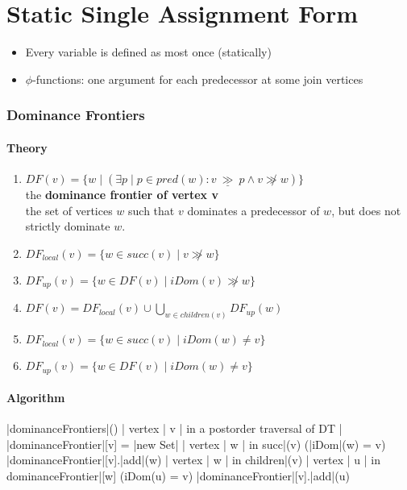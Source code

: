 \documentclass[a4paper,12pt, notitlepage]{article}
\newcommand{\gge}{\ \underline{\gg}\ }
\newcommand{\existe}[3]{(\exists #1 \mid #2 : #3)}
\begin{document}
\section*{Static Single Assignment Form}
\begin{itemize}
\item Every variable is defined as most once (statically)
\item $\phi$-functions: one argument for each predecessor at some join vertices
\end{itemize}

\subsubsection*{Dominance Frontiers}
\paragraph*{Theory}
\begin{enumerate}
\item $DF(v) = \{w \mid \existe{p}{p \in pred(w)}{v \gge p \land v \not\gg w}\}$
\\ the \textbf{dominance frontier of vertex v}
\\ the set of vertices $w$ such that $v$ dominates a predecessor of $w$, but does
not strictly dominate $w$.
\item $DF_{local}(v) = \{w \in succ(v) \mid v \not\gg w\}$
\item $DF_{up}(v) = \{w \in DF(v) \mid iDom(v) \not\gg w\}$
\item $DF(v) = DF_{local}(v) \cup 
    \displaystyle \bigcup_{w \in children(v)} DF_{up}(w)$
\item $DF_{local}(v) = \{w \in succ(v) \mid iDom(w) \not= v\}$
\item $DF_{up}(v) = \{w \in DF(v) \mid iDom(w) \not= v\}$
\end{enumerate}

\paragraph*{Algorithm}
\begin{program}
\PROC |dominanceFrontiers|() \BODY
    \FOREACH | vertex | v | in a postorder traversal of DT | \DO
        |dominanceFrontier|[v] = |new Set|
        \FOREACH | vertex | w | in succ|(v) \DO
            \IF (|iDom|(w) \not= v) \AR*
                |dominanceFrontier|[v].|add|(w)
            \FI
        \OD
        \FOREACH | vertex | w | in children|(v) \DO
            \FOREACH | vertex | u | in dominanceFrontier|[w] \DO
                \IF (iDom(u) \not= v) \AR*
                    |dominanceFrontier|[v].|add|(u)
                \FI
            \OD
        \OD
    \OD
\end{program}
\end{document}
